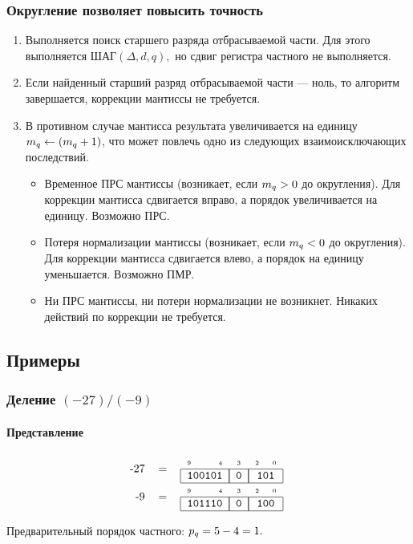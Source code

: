 \begin{frame}
    \frametitle{Округление позволяет повысить точность}
    
    \begin{enumerate}
        \item Выполняется поиск старшего разряда отбрасываемой части. Для этого выполняется
        \(
            \text{ШАГ}(\Delta,d,q),
        \)
        но сдвиг регистра частного не выполняется.
        
        \item Если найденный старший разряд отбрасываемой части --- ноль, то алгоритм завершается, коррекции мантиссы не требуется.
        
        \item В противном случае мантисса результата увеличивается на единицу $m_{q}\gets(m_{q}+1)$, что может повлечь одно из следующих взаимоисключающих последствий.
        \begin{itemize}
            \item Временное ПРС мантиссы (возникает, если $m_{q}>0$ до округления). Для коррекции мантисса сдвигается вправо, а порядок увеличивается на единицу. Возможно ПРС.
            
            \item Потеря нормализации мантиссы (возникает, если $m_{q}<0$ до округления). Для коррекции мантисса сдвигается влево, а порядок на единицу уменьшается. Возможно ПМР.
            
            \item Ни ПРС мантиссы, ни потери нормализации не возникнет. Никаких действий по коррекции не требуется.
        \end{itemize}
    \end{enumerate}
\end{frame}


\subsection{Примеры}

\begin{frame}
    \frametitle{Деление $(-27)/(-9)$}
    \framesubtitle{Представление}

    \[
        \begin{tabular}{rcc}
           -27 & = & \FloatMyDcOrderX{100101}{0}{101}\\
            -9 & = & \FloatMyDcOrderX{101110}{0}{100}\\
        \end{tabular}
    \]
    
    Предварительный порядок частного:
    \(p_{q}=5-4=1.\)
\end{frame}

